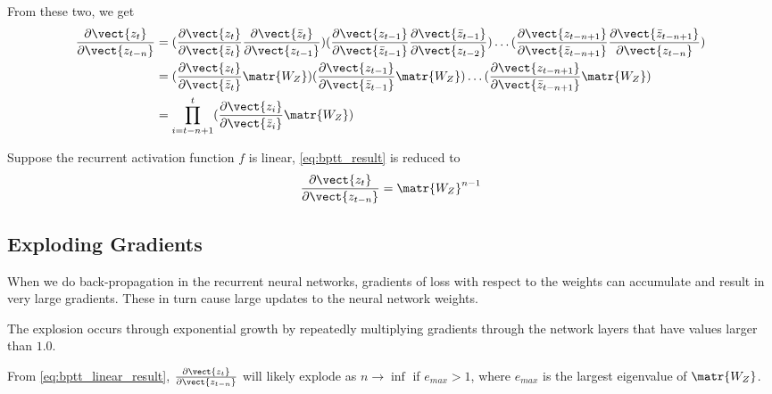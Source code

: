 From these two, we get
\begin{align} \label{eq:bptt_result}
\begin{split}
\frac{\partial \vect{z_t}}{\partial \vect{z_{t-n}}} &= (\frac{\partial \vect{z_t}}{\partial \vect{\bar{z}_{t}}}\frac{\partial \vect{\bar{z}_{t}}}{\partial \vect{z_{t-1}}})
(\frac{\partial \vect{z_{t-1}}}{\partial \vect{\bar{z}_{t-1}}}\frac{\partial \vect{\bar{z}_{t-1}}}{\partial \vect{z_{t-2}}}) \ldots 
(\frac{\partial \vect{z_{t-n+1}}}{\partial \vect{\bar{z}_{t-n+1}}}\frac{\partial \vect{\bar{z}_{t-n+1}}}{\partial \vect{z_{t-n}}}) \\
&= (\frac{\partial \vect{z_t}}{\partial \vect{\bar{z}_{t}}}\matr{W_Z})
(\frac{\partial \vect{z_{t-1}}}{\partial \vect{\bar{z}_{t-1}}}\matr{W_Z}) \ldots 
(\frac{\partial \vect{z_{t-n+1}}}{\partial \vect{\bar{z}_{t-n+1}}}\matr{W_Z}) \\
&= \prod\limits_{i=t-n+1}^{t} (\frac{\partial \vect{z_i}}{\partial \vect{\bar{z}_{i}}}\matr{W_Z})
\end{split}
\end{align}

Suppose the recurrent activation function $f$ is linear, \cref{eq:bptt_result} is reduced to
\begin{equation} \label{eq:bptt_linear_result}
\frac{\partial \vect{z_t}}{\partial \vect{z_{t-n}}} = \matr{W_Z}^{n-1}
\end{equation}


\subsection{Exploding Gradients}
When we do back-propagation in the recurrent neural networks, gradients of loss with respect to the weights can accumulate and result in very large gradients.
These in turn cause large updates to the neural network weights.


The explosion occurs through exponential growth by repeatedly multiplying gradients through the network layers that have values larger than $1.0$.

From \cref{eq:bptt_linear_result}, $\frac{\partial \vect{z_t}}{\partial \vect{z_{t-n}}}$ will likely explode as $n \rightarrow \inf$ if $e_{max} > 1$, where $e_{max}$ is the largest eigenvalue of $\matr{W_Z}$.

